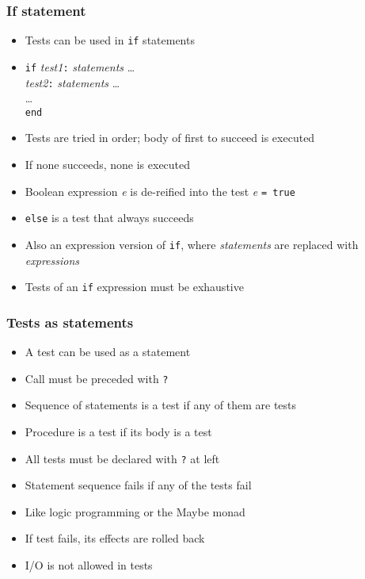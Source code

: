 \documentclass[12pt]{beamer}
\begin{document}
\begin{frame}
\frametitle{If statement}
\begin{itemize}
\item Tests can be used in \texttt{if} statements
\item \texttt{if} \emph{test1}\texttt{:} \emph{statements} \ldots \\
\hspace*{1em} \emph{test2}\texttt{:} \emph{statements} \ldots \\
\hspace*{1em} \ldots \\
\texttt{end}
\item Tests are tried in order; body of first to succeed is executed
\item If none succeeds, none is executed
\item Boolean expression \emph{e} is de-reified into the test \emph{e}
  \texttt{= true}
\item \texttt{else} is a test that always succeeds
\item Also an expression version of \texttt{if}, where
  \emph{statements} are replaced with \emph{expressions}
\item Tests of an \texttt{if} expression must be exhaustive
\end{itemize}
\end{frame}


\begin{frame}
\frametitle{Tests as statements}
\begin{itemize}
\item A test can be used as a statement
\item Call must be preceded with \texttt{?}
\item Sequence of statements is a test if any of them are tests
\item Procedure is a test if its body is a test
\item All tests must be declared with \texttt{?} at left
\item Statement sequence fails if any of the tests fail
\item Like logic programming or the Maybe monad
\item If test fails, its effects are rolled back
\item I/O is not allowed in tests
\end{itemize}
\end{frame}
\end{document}
